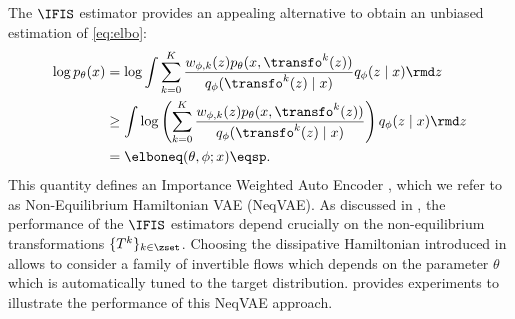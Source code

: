 The $\IFIS$ estimator provides an appealing alternative to obtain an unbiased estimation of \eqref{eq:elbo}:  
\begin{align*}
\log p_\theta(x) %
 &=\log \int\sum_{k=0}^{K}\frac{w_{\phi,k}(z) p_\theta(x,\transfo^k(z)) }{q_\phi(\transfo^k(z)\mid x)}  q_\phi(z\mid x)\rmd z\\
&\geq  \int \log\left( \sum_{k=0}^{K}\frac{w_{\phi,k}(z) p_\theta(x,\transfo^k(z)) }{q_\phi(\transfo^k(z)\mid x)}\right)  q_\phi(z\mid x)\rmd z\\
&= \elboneq(\theta, \phi;x)\eqsp.
\end{align*}
This quantity defines an Importance Weighted Auto Encoder \cite{burda:grosse:2015}, which we refer to as Non-Equilibrium Hamiltonian VAE (NeqVAE). 
As discussed in , the performance of the $\IFIS$ estimators depend crucially on the non-equilibrium transformations $\{T^k\}_{k\in\zset}$. Choosing the dissipative Hamiltonian introduced in  allows to consider a family of invertible flows which depends on the parameter $\theta$ which is automatically tuned to the target distribution.  provides  experiments to illustrate the performance of this NeqVAE approach.




